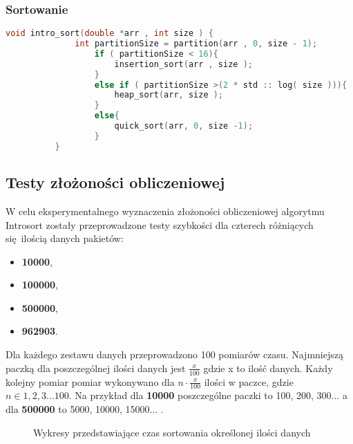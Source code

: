 \documentclass[12pt]{article}
\begin{document}
\subsubsection{Sortowanie}

{\small
\begin{lstlisting}[language=C++]
       void intro_sort(double *arr , int size ) {
              int partitionSize = partition(arr , 0, size - 1);
                  if ( partitionSize < 16){
                      insertion_sort(arr , size );
                  }
                  else if ( partitionSize >(2 * std :: log( size ))){
                      heap_sort(arr, size );
                  }
                  else{
                      quick_sort(arr, 0, size -1);
                  }
          }
       \end{lstlisting}

}

\subsection{Testy złożoności obliczeniowej}
W celu eksperymentalnego wyznaczenia złożoności obliczeniowej algorytmu Introsort zostały przeprowadzone testy szybkości dla 
czterech różniących się ilością danych pakietów: 
\begin{itemize}
       \item \textbf{10000},
       \item  \textbf{100000},
       \item \textbf{500000},
       \item \textbf{962903}.
\end{itemize}
Dla każdego zestawu danych przeprowadzono 100 pomiarów czasu. Najmniejszą paczką dla poszczególnej ilości danych jest 
$\frac{x}{100}$ gdzie x to ilość danych. Każdy kolejny pomiar pomiar wykonywano dla $n \cdot \frac{x}{100}$ ilości w paczce,
gdzie $n \in 1,2,3 ... 100$.
Na przykład dla \textbf{10000} poszczególne paczki to 100, 200, 300... a dla \textbf{500000} to 5000, 10000, 15000... .


\begin{figure}[H]
       \centering
       \quad
\end{figure}
\begin{figure}[H]\ContinuedFloat
       \centering
       \quad
       \renewcommand{\figurename}{Wykres.}
       \caption{Wykresy przedstawiające czas sortowania określonej ilości danych}
       \label{fig: introsort}
\end{figure}
\end{document}

